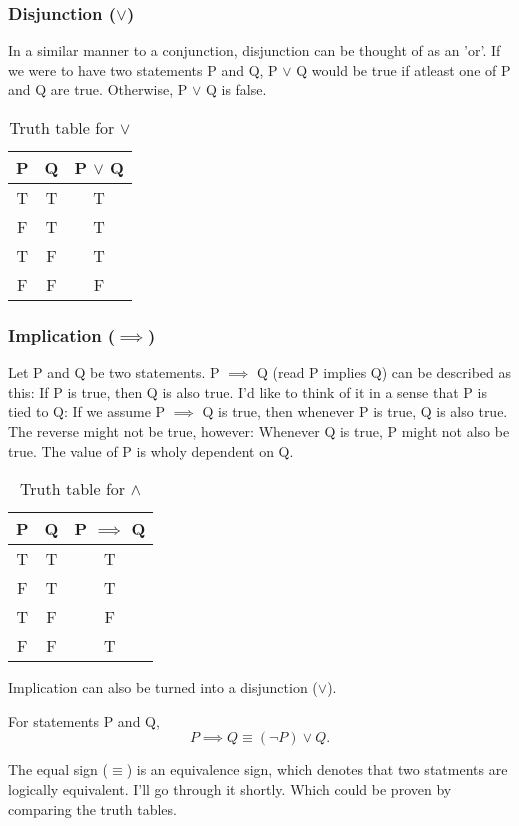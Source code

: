 \documentclass[a4paper]{article}
\begin{document}
\subsubsection{Disjunction ($\vee$)}
In a similar manner to a conjunction, disjunction can be thought of as an 'or'. If we were to have two statements P and Q, P $\vee$ Q would be true if atleast one of P and Q are true. Otherwise, P $\vee$ Q is false.

\begin{table}[htpb]
	\centering
	\caption{Truth table for $\vee$}
	\label{tab:disjunction table}
	\vspace{5pt}
	\begin{tabular}{c|c|c}
		P & Q & P $\vee$ Q\\ \hline
		T & T & T \\
		F & T & T \\
		T & F & T \\
		F & F & F \\
	\end{tabular}
\end{table}
\subsubsection{Implication ($\implies$)}
Let P and Q be two statements. P $\implies$ Q (read P implies Q) can be described as this: If P is true, then Q is also true. I'd like to think of it in a sense that P is tied to Q: If we assume P $\implies$ Q is true, then whenever P is true, Q is also true. The reverse might not be true, however: Whenever Q is true, P might not also be true. The value of P is wholy dependent on Q.


\begin{table}[htpb]
	\centering
	\caption{Truth table for $\wedge$}
	\label{tab:implication table}
	\vspace{5pt}
	\begin{tabular}{c|c|c}
		P & Q & P $\implies$ Q\\ \hline
		T & T & T \\
		F & T & T \\
		T & F & F \\
		F & F & T \\
	\end{tabular}
\end{table}

Implication can also be turned into a disjunction ($\vee$).
\begin{tcolorbox}
	For statements P and Q, \[
	P \implies Q \equiv \left( \neg P \right) \vee Q 
	.\] 
\end{tcolorbox}
The equal sign ($\equiv$) is an equivalence sign, which denotes that two statments are logically equivalent. I'll go through it shortly.
Which could be proven by comparing the truth tables.
\end{document}
